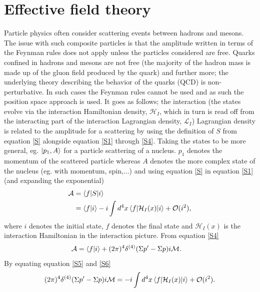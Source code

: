 \section{Effective field theory}
Particle physics often consider scattering events between hadrons and mesons. The issue with such composite particles is that the amplitude written in terms of the Feynman rules does not apply unless the particles considered are free. Quarks confined in hadrons and mesons are not free (the majority of the hadron mass is made up of the gluon field produced by the quark) and further more; the underlying theory describing the behavior of the quarks (QCD) is non-perturbative. In such cases the Feynman rules cannot be used and as such the position space approach is used. It goes as follows; the interaction (the states evolve via the interaction Hamiltonian density, $\mathcal{H}_I$, which in turn is read off from the interacting part of the interaction Lagrangian density, $\mathcal{L}_I$) Lagrangian density is related to the amplitude for a scattering by using the definition of $S$ from equation \eqref{S} alongside equation \eqref{S1} through \eqref{S4}. Taking the states to be more general, eg. $\ket{p_1, A}$ for a particle scattering of a nucleus. $p_1$ denotes the momentum of the scattered particle whereas $A$ denotes the more complex state of the nucleus (eg. with momentum, spin,...) and using equation \eqref{S} in equation \eqref{S1} (and expanding the exponential)
\begin{equation}
	\begin{split}
		\mathcal{A}&=\braket{f|S|i}\\
		&=\braket{f|i}-i\int d^4x\braket{f|\mathcal{H}_I(x)|i}+\mathcal{O}(i^2),
	\end{split}
	\label{S5}
\end{equation} 
where $i$ denotes the initial state, $f$ denotes the final state and $\mathcal{H}_I(x)$ is the interaction Hamiltonian in the interaction picture. From equation \eqref{S4}
\begin{equation}
	\begin{split}
		\mathcal{A}&=\braket{f|i}+(2\pi)^4\delta^{(4)}(\Sigma p'-\Sigma p)i\mathcal{M}.
	\end{split}
	\label{S6}
\end{equation} 
By equating equation \eqref{S5} and \eqref{S6}
\begin{equation}
	(2\pi)^4\delta^{(4)}(\Sigma p'-\Sigma p)i\mathcal{M}=-i\int d^4x\braket{f|\mathcal{H}_I(x)|i} +\mathcal{O}(i^2).
	\label{S7}
\end{equation} 

